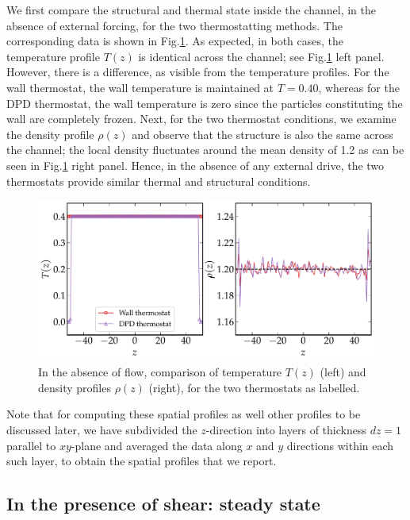 We first compare the structural and thermal state inside the channel, in the absence of external forcing, for the two thermostatting methods.  The corresponding data is shown in Fig.\ref{fig1}.  As expected, in both cases, the temperature profile $T(z)$ is identical across the channel; see  Fig.\ref{fig1} left panel. However, there is a difference, as visible from the temperature profiles. For the wall thermostat, the wall temperature is maintained at $T=0.40$, whereas for the DPD thermostat, the wall temperature is zero since the particles constituting the wall are completely frozen. Next, for the two thermostat conditions, we examine the density profile $\rho(z)$ and observe that the structure is also the same across the channel; the local density fluctuates around the mean density of 1.2 as can be seen in  Fig.\ref{fig1} right panel.  Hence, in the absence of any external drive, the two thermostats provide similar thermal and structural conditions.
\begin{figure}
\centering
\includegraphics[width=15cm]{figs/compThermostat.pdf}
\caption[{\em Temperature and density profiles in the absence of flow}]{In the absence of flow, comparison of temperature $T(z)$ (left) and density profiles $\rho(z)$ (right), for the two thermostats as labelled.}
\label{fig1}
\end{figure}

Note that for computing these spatial profiles as well other profiles to be discussed later, we have subdivided the $z$-direction into layers of thickness $dz = 1$ parallel to $xy$-plane and averaged the data along $x$ and $y$ directions within each such layer, to obtain the spatial profiles that we report.


\subsection{In the presence of shear: steady state}

